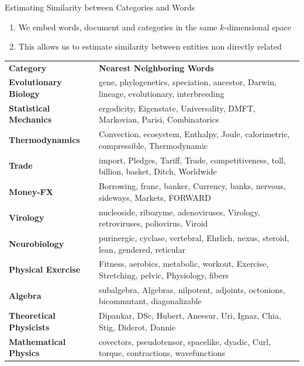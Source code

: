 \documentclass[10pt]{beamer}
\begin{document}
\begin{frame}{Estimating Similarity between Categories and Words }
\begin{enumerate}
	\vfill\item We embed words, document and categories in the same $k$-dimensional space
	\vfill\item This allows us to estimate similarity between entities non directly related
\end{enumerate}
\begin{table}[h!]
\tabcolsep=1mm
\scriptsize
\begin{center}
\begin{tabular}{l@{\hskip3mm} l}
\toprule
\multirow{2}{*}{\textbf{Category}} & \multirow{2}{*}{\textbf{Nearest Neighboring Words}} \\
 & \\
\textbf{Evolutionary Biology}   & gene, phylogenetics, speciation, ancestor, Darwin, lineage, evolutionary, interbreeding \\
\textbf{Statistical Mechanics}  & ergodicity, Eigenstate, Universality, DMFT, Markovian, Parisi, Combinatorics \\
\textbf{Thermodynamics}         & Convection, ecosystem, Enthalpy, Joule, calorimetric, compressible, Thermodynamic \\
\textbf{Trade}                  & import, Pledges, Tariff, Trade, competitiveness, toll, billion, basket, Ditch, Worldwide \\
\textbf{Money-FX}               & Borrowing, franc, banker, Currency, banks, nervous, sideways, Markets, FORWARD \\
\textbf{Virology}               & nucleoside, ribozyme, adenoviruses, Virology, retroviruses, poliovirus, Viroid \\
\textbf{Neurobiology}           & purinergic, cyclase, vertebral, Ehrlich, nexus, steroid, lean, gendered, reticular \\
\textbf{Physical Exercise}      & Fitness, aerobics, metabolic, workout, Exercise, Stretching, pelvic, Physiology, fibers \\
\textbf{Algebra}                & subalgebra, Algebras, nilpotent, adjoints, octonions, bicommutant, diagonalizable \\
\textbf{Theoretical Physicists} & Dipankar, DSc, Hubert, Aneesur, Uri, Ignaz, Chia, Stig, Diderot, Dannie \\
\textbf{Mathematical Physics}   & covectors, pseudotensor, spacelike, dyadic, Curl, torque, contractions, wavefunctions \\

\end{tabular}
\end{center}
\end{table}
\end{frame}
\end{document}
